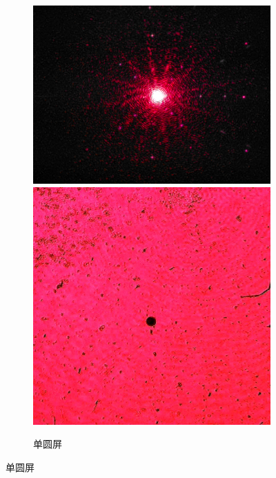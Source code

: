 \documentclass[a4paper]{article}
\begin{document}
\clearpage
\begin{figure}[htbp]\ContinuedFloat
    \centering
    \begin{subfigure}[htbp]{0.3\textwidth}
        \centering
        \includegraphics[width=\textwidth]{fre-done/2-5.JPG}
        \includegraphics[width=\textwidth]{img-done/2-5.JPG}
        \caption{单圆屏}

\end{subfigure}
\end{figure}
\end{document}
